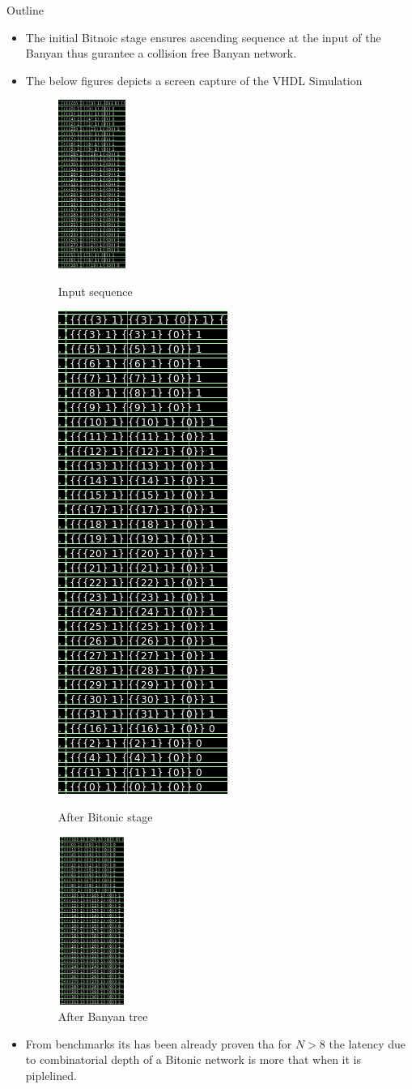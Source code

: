 \begin{frame}[allowframebreaks]{Outline}
\begin{itemize}
  \item  The initial Bitnoic stage ensures ascending sequence at the input of the Banyan thus gurantee a collision free Banyan network. \\
  \item  The below figures depicts a screen capture of the VHDL Simulation\\
   \begin{figure}[!htb]
  \includegraphics[width=2.2 cm, height=5.5cm]{figures/1}
  \caption{Input sequence}
  \endminipage\hfill
  \includegraphics[width=2.2 cm, height=5.5 cm]{figures/2}
  \caption{After Bitonic stage}
  \endminipage\hfill
  \includegraphics[width=2.2cm, height=5.5cm]{figures/3}
  \caption{After Banyan tree}
  \endminipage
  \end{figure}
  \item From benchmarks its has been already proven tha for $N > 8$ the latency due to combinatorial depth of a Bitonic network is more that when it is piplelined.\\

\end{itemize}
\end{frame}
